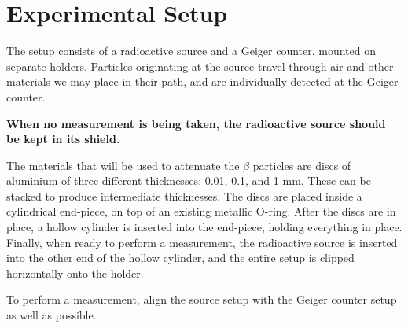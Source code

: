 \section{Experimental Setup}

The setup consists of a radioactive source and a Geiger counter, mounted on separate holders. Particles originating at the source travel through air and other materials we may place in their path, and are individually detected at the Geiger counter.

\textbf{When no measurement is being taken, the radioactive source should be kept in its shield.}

The materials that will be used to attenuate the $\beta$ particles are discs of aluminium of three different thicknesses: 0.01, 0.1, and 1 mm. These can be stacked to produce intermediate thicknesses. The discs are placed inside a cylindrical end-piece, on top of an existing metallic O-ring. After the discs are in place, a hollow cylinder is inserted into the end-piece, holding everything in place. Finally, when ready to perform a measurement, the radioactive source is inserted into the other end of the hollow cylinder, and the entire setup is clipped horizontally onto the holder.

To perform a measurement, align the source setup with the Geiger counter setup as well as possible.